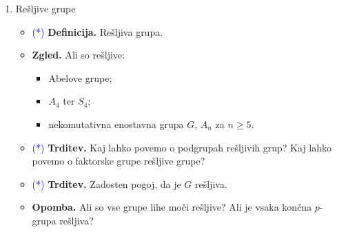 \begin{enumerate}
    \item Rešljive grupe
    \begin{itemize}
        \item \textcolor{blue}{(*)} \textbf{Definicija.} Rešljiva grupa.
        \item \textbf{Zgled.} Ali so rešljive:
        \begin{itemize}
            \item Abelove grupe;
            \item \(A_4\) ter \(S_4\);
            \item nekomutativna enostavna grupa \(G\), \(A_n\) za \(n \geq 5\).
        \end{itemize}
        \item \textcolor{blue}{(*)} \textbf{Trditev.} Kaj lahko povemo o podgrupah rešljivih grup? Kaj lahko povemo o faktorske grupe rešljive grupe?
        \item \textcolor{blue}{(*)} \textbf{Trditev.} Zadosten pogoj, da je \(G\) rešljiva.
        \item \textbf{Opomba.} Ali so vse grupe lihe moči rešljive? Ali je vsaka končna \(p\)-grupa rešljiva?
    \end{itemize}
\end{enumerate}